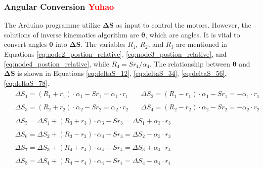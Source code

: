 \subsubsection{Angular Conversion \textcolor{red}{Yuhao}}
The Arduino programme utilize $\boldsymbol{\Delta S}$ as input to control the motors. However, the solutions of inverse 
kinematics algorithm are $\boldsymbol{\theta}$, which are angles. It is vital to convert angles $\boldsymbol{\theta}$ 
into $\boldsymbol{\Delta S}$. The variables $R_1$, $R_2$, and $R_3$ are mentioned in Equations 
\ref{eq:node2_postion_relative}, \ref{eq:node3_postion_relative}, and \ref{eq:node4_postion_relative}, while 
$R_4 = {Sr}_4/ \alpha_4$. The relationship between $\boldsymbol{\theta}$ and $\boldsymbol{\Delta S}$ is shown in 
Equations \ref{eq:deltaS_12}, \ref{eq:deltaS_34}, \ref{eq:deltaS_56}, \ref{eq:deltaS_78}.
\begin{align}
    &\begin{aligned}
        \Delta S_1=(R_1+r_1)\cdot\alpha_1-Sr_1 = \alpha_1\cdot r_1
    \end{aligned} 
    \quad
    \begin{aligned}
        \Delta S_2=(R_1-r_1)\cdot\alpha_1-Sr_1 = -\alpha_1\cdot r_1
    \end{aligned} 
    \label{eq:deltaS_12} \\
    &\begin{aligned} 
        \Delta S_3=(R_2+r_2)\cdot\alpha_2-Sr_2 = \alpha_2\cdot r_2
    \end{aligned}
    \quad
    \begin{aligned}
        \Delta S_4=(R_2-r_2)\cdot\alpha_2-Sr_2 = -\alpha_2\cdot r_2
    \end{aligned}
    \label{eq:deltaS_34} \\
    &\begin{aligned}
        \Delta S_5= \Delta S_1+ (R_3+r_3)\cdot\alpha_3-Sr_3 = \Delta S_1+\alpha_3\cdot r_3
    \end{aligned} \nonumber
    \\
    &\begin{aligned}
        \Delta S_6= \Delta S_2 + (R_3-r_3)\cdot\alpha_3-Sr_3 = \Delta S_2-\alpha_3\cdot r_3
    \end{aligned}
    \label{eq:deltaS_56} \\
    &\begin{aligned} 
        \Delta S_7=\Delta S_3+(R_4+r_4)\cdot\alpha_4-Sr_4 = \Delta S_3+\alpha_4\cdot r_4
    \end{aligned} \nonumber
    \\
    &\begin{aligned}
        \Delta S_8=\Delta S_4+(R_4-r_4)\cdot\alpha_4-Sr_4 = \Delta S_4-\alpha_4\cdot r_4
    \end{aligned}
    \label{eq:deltaS_78}
\end{align}
